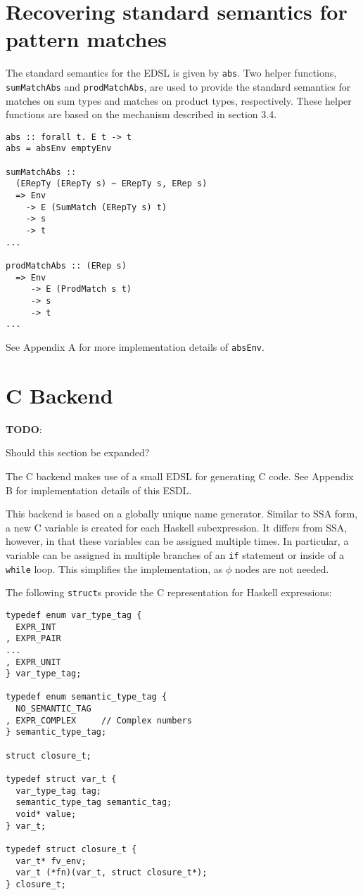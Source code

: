 \documentclass[sigplan,anonymous,review]{acmart}
\newcommand{\ttt}{\texttt}
\newenvironment{todo}
  {\begin{tcolorbox}
   \textbf{TODO}:
  }
  {\end{tcolorbox}
  }
\begin{document}
\section{Recovering standard semantics for pattern matches}

The standard semantics for the EDSL is given by \ttt{abs}. Two helper
functions, \ttt{sumMatchAbs} and \ttt{prodMatchAbs}, are used to provide
the standard semantics for matches on sum types and matches on product
types, respectively. These helper functions are based on the mechanism
described in section 3.4.

\begin{lstlisting}
abs :: forall t. E t -> t
abs = absEnv emptyEnv

sumMatchAbs ::
  (ERepTy (ERepTy s) ~ ERepTy s, ERep s)
  => Env
    -> E (SumMatch (ERepTy s) t)
    -> s
    -> t
...

prodMatchAbs :: (ERep s)
  => Env
     -> E (ProdMatch s t)
     -> s
     -> t
...
\end{lstlisting}

See Appendix A for more implementation details of \ttt{absEnv}.


\section{C Backend}
\begin{todo}
  Should this section be expanded?
\end{todo}

The C backend makes use of a small EDSL for generating C code. See
Appendix B for implementation details of this ESDL.

This backend is based on a globally unique name generator. Similar to
SSA form, a new C variable is created for each Haskell subexpression.
It differs from SSA, however, in that these variables can be assigned multiple
times. In particular, a variable can be assigned in multiple branches of
an \ttt{if} statement or inside of a \ttt{while} loop. This simplifies
the implementation, as $\phi$ nodes are not needed.

The following \ttt{struct}s provide the C representation for Haskell expressions:

\begin{lstlisting}
typedef enum var_type_tag {
  EXPR_INT
, EXPR_PAIR
...
, EXPR_UNIT
} var_type_tag;

typedef enum semantic_type_tag {
  NO_SEMANTIC_TAG
, EXPR_COMPLEX     // Complex numbers
} semantic_type_tag;

struct closure_t;

typedef struct var_t {
  var_type_tag tag;
  semantic_type_tag semantic_tag;
  void* value;
} var_t;

typedef struct closure_t {
  var_t* fv_env;
  var_t (*fn)(var_t, struct closure_t*);
} closure_t;
\end{lstlisting}
\end{document}
